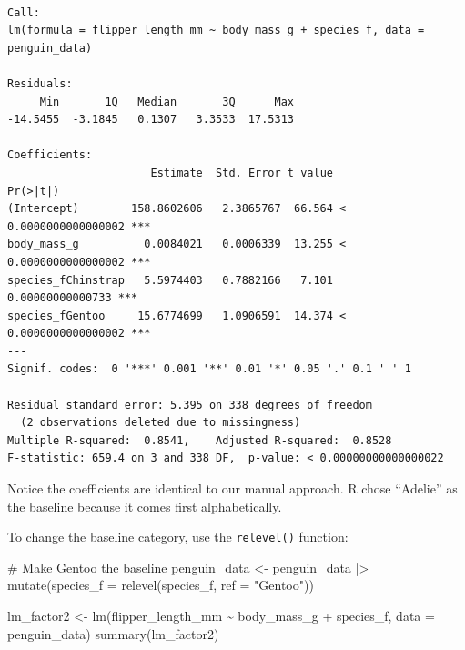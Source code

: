 \documentclass[
  letterpaper,
  DIV=11,
  numbers=noendperiod]{scrreprt}
\newenvironment{Shaded}{\begin{snugshade}}{\end{snugshade}}
\newcommand{\AttributeTok}[1]{\textcolor[rgb]{0.40,0.45,0.13}{#1}}
\newcommand{\CommentTok}[1]{\textcolor[rgb]{0.37,0.37,0.37}{#1}}
\newcommand{\FunctionTok}[1]{\textcolor[rgb]{0.28,0.35,0.67}{#1}}
\newcommand{\NormalTok}[1]{\textcolor[rgb]{0.00,0.23,0.31}{#1}}
\newcommand{\OtherTok}[1]{\textcolor[rgb]{0.00,0.23,0.31}{#1}}
\newcommand{\SpecialCharTok}[1]{\textcolor[rgb]{0.37,0.37,0.37}{#1}}
\newcommand{\StringTok}[1]{\textcolor[rgb]{0.13,0.47,0.30}{#1}}
\begin{document}
\begin{verbatim}

Call:
lm(formula = flipper_length_mm ~ body_mass_g + species_f, data = penguin_data)

Residuals:
     Min       1Q   Median       3Q      Max 
-14.5455  -3.1845   0.1307   3.3533  17.5313 

Coefficients:
                      Estimate  Std. Error t value             Pr(>|t|)    
(Intercept)        158.8602606   2.3865767  66.564 < 0.0000000000000002 ***
body_mass_g          0.0084021   0.0006339  13.255 < 0.0000000000000002 ***
species_fChinstrap   5.5974403   0.7882166   7.101     0.00000000000733 ***
species_fGentoo     15.6774699   1.0906591  14.374 < 0.0000000000000002 ***
---
Signif. codes:  0 '***' 0.001 '**' 0.01 '*' 0.05 '.' 0.1 ' ' 1

Residual standard error: 5.395 on 338 degrees of freedom
  (2 observations deleted due to missingness)
Multiple R-squared:  0.8541,    Adjusted R-squared:  0.8528 
F-statistic: 659.4 on 3 and 338 DF,  p-value: < 0.00000000000000022
\end{verbatim}

Notice the coefficients are identical to our manual approach. R chose
``Adelie'' as the baseline because it comes first alphabetically.

To change the baseline category, use the \texttt{relevel()} function:

\begin{Shaded}
\begin{Highlighting}[]
\CommentTok{\# Make Gentoo the baseline}
\NormalTok{penguin\_data }\OtherTok{\textless{}{-}}\NormalTok{ penguin\_data }\SpecialCharTok{|\textgreater{}} 
    \FunctionTok{mutate}\NormalTok{(}\AttributeTok{species\_f =} \FunctionTok{relevel}\NormalTok{(species\_f, }\AttributeTok{ref =} \StringTok{"Gentoo"}\NormalTok{))}

\NormalTok{lm\_factor2 }\OtherTok{\textless{}{-}} \FunctionTok{lm}\NormalTok{(flipper\_length\_mm }\SpecialCharTok{\textasciitilde{}}\NormalTok{ body\_mass\_g }\SpecialCharTok{+}\NormalTok{ species\_f, }\AttributeTok{data =}\NormalTok{ penguin\_data)}
\FunctionTok{summary}\NormalTok{(lm\_factor2)}
\end{Highlighting}
\end{Shaded}
\end{document}

